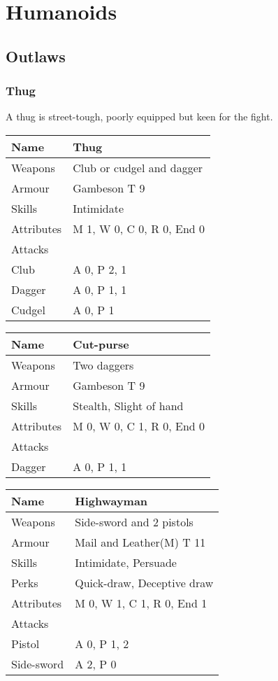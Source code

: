 \documentclass[a4paper,11pt,oneside]{book}
\newcommand{\textlf}[1]{\textbf{\titlecap{#1}}}
\begin{document}
\section{Humanoids}

\subsection{Outlaws}

\subsubsection{Thug}
A thug is street-tough, poorly equipped but keen for the fight. 

\begin{tabular}{|l|l|}
	\hline
	Name & Thug\\
	\hline
	Weapons & Club or cudgel and dagger\\
	Armour & Gambeson T 9\\
	Skills & Intimidate\\
	Attributes & M 1, W 0, C 0, R 0, End 0\\ 
	\hline
	Attacks & \\
	\hline
	Club & A 0, P 2, \textlf{penetration} 1\\
	Dagger & A 0, P 1, \textlf{Rending} 1 \\
	Cudgel & A 0, P 1\\ 
	\hline
\end{tabular}

\begin{tabular}{|l|l|}
	\hline
	Name & Cut-purse\\
	\hline
	Weapons & Two daggers\\
	Armour & Gambeson T 9\\
	Skills & Stealth, Slight of hand\\
	Attributes & M 0, W 0, C 1, R 0, End 0\\ 
	\hline
	Attacks & \\
	\hline
	Dagger & A 0, P 1, \textlf{Rending} 1 \\
	\hline
\end{tabular}

\begin{tabular}{|l|l|}
	\hline
	Name & Highwayman\\
	\hline
	Weapons & Side-sword and 2 pistols\\
	Armour & Mail and Leather(M) T 11\\
	Skills & Intimidate, Persuade\\
	Perks & Quick-draw, Deceptive draw \\
	Attributes & M 0, W 1, C 1, R 0, End 1\\ 
	\hline
	Attacks & \\
	\hline
	Pistol & A 0, P 1, \textlf{penetration} 2\\
	Side-sword & A 2, P 0 \\
	\hline
\end{tabular}
\end{document}
